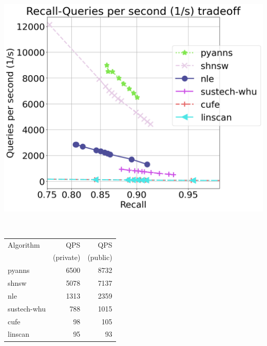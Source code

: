 \ifnotarxiv
\begin{minipage}{\textwidth}
\begin{minipage}[b]{0.6\textwidth}
    \centering
\includegraphics[width=.6\textwidth]{fig/sparse-full.png}
    \label{fig:sparse_results}
\end{minipage}
~
\begin{minipage}[b]{0.38\textwidth}
\centering
\small
\begin{tabular}{lrr}
\hline
Algorithm & QPS       & QPS \\
          & (private) & (public) \\
\hline
pyanns & 6500 & 8732 \\
shnsw & 5078 & 7137 \\
nle & 1313 & 2359 \\
sustech-whu & 788 & 1015\\ 
cufe & 98 & 105 \\
linscan & 95 & 93 \\
\hline
\end{tabular}
\label{tab:sparse}
\end{minipage}
\end{minipage}
\fi 

\ifarxiv 

